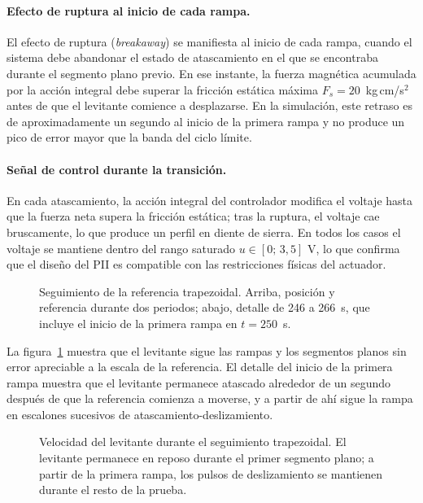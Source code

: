 \paragraph{Efecto de ruptura al inicio de cada rampa.}
El efecto de ruptura (\emph{breakaway}) se manifiesta al inicio de cada
rampa, cuando el sistema debe abandonar el estado de atascamiento en el que se encontraba
durante el segmento plano previo.
En ese instante, la fuerza magnética acumulada por la acción integral debe superar la
fricción estática máxima $F_s = 20$~kg\,cm/s$^2$ antes de que el levitante comience a desplazarse.
En la simulación, este retraso es de aproximadamente un segundo al inicio de la primera rampa y no produce un pico de error mayor que la banda del ciclo límite.

\paragraph{Señal de control durante la transición.}
En cada atascamiento, la acción integral del controlador modifica el voltaje hasta que la fuerza neta supera la fricción estática; tras la ruptura, el voltaje cae bruscamente, lo que produce un perfil en diente de sierra.
En todos los casos el voltaje se mantiene dentro del rango saturado $u \in [0;\,3{,}5]$ V,
lo que confirma que el diseño del PII es compatible con las restricciones físicas del
actuador.

\begin{figure}[ht]
    \centering
    
    \caption[Seguimiento trapezoidal: posición]{Seguimiento de la referencia trapezoidal. Arriba, posición y referencia durante dos periodos; abajo, detalle de 246 a 266~s, que incluye el inicio de la primera rampa en $t=250$~s.}
    \label{fig:trap_pos}
\end{figure}

La figura~\ref{fig:trap_pos} muestra que el levitante sigue las rampas y los segmentos planos sin error apreciable a la escala de la referencia. El detalle del inicio de la primera rampa muestra que el levitante permanece atascado alrededor de un segundo después de que la referencia comienza a moverse, y a partir de ahí sigue la rampa en escalones sucesivos de atascamiento-deslizamiento.

\FloatBarrier

\begin{figure}[ht]
    \centering
    
    \caption[Seguimiento trapezoidal: velocidad]{Velocidad del levitante durante el seguimiento trapezoidal. El levitante permanece en reposo durante el primer segmento plano; a partir de la primera rampa, los pulsos de deslizamiento se mantienen durante el resto de la prueba.}
    \label{fig:trap_vel}
\end{figure}


